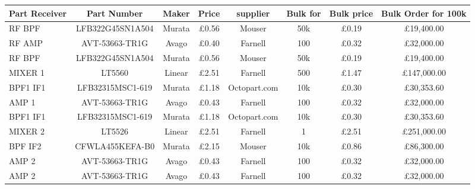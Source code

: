 

\begin{sidewaystable} %
\centering %
\begin{tabular}{l c c c c c c c} %

Part Receiver & Part Number & Maker & Price & supplier & Bulk for & Bulk price & Bulk Order for 100k\\ %
\midrule %

RF BPF& LFB322G45SN1A504& Murata& \pounds0.56 &Mouser &50k& \pounds0.19 &\pounds19,400.00\\
RF AMP & AVT-53663-TR1G &Avago &\pounds0.40 &Farnell &100 & \pounds 0.32& \pounds32,000.00\\
RF BPF& LFB322G45SN1A504& Murata& \pounds0.56 &Mouser &50k& \pounds0.19 &\pounds19,400.00\\
MIXER 1 & LT5560 &Linear 
&\pounds2.51 &Farnell &500 &\pounds1.47 &\pounds147,000.00\\
BPF1 IF1&  LFB32315MSC1-619& Murata& \pounds1.18& Octopart.com &10k& \pounds0.30& \pounds30,353.60\\
AMP 1 & AVT-53663-TR1G& Avago &\pounds0.43 &Farnell &100 &\pounds0.32 &\pounds32,000.00\\
BPF1 IF1& LFB32315MSC1-619& Murata& \pounds1.18 & Octopart.com &10k& \pounds0.30& \pounds30,353.60\\
MIXER 2& LT5526& Linear &\pounds2.51 &Farnell& 1 &\pounds2.51 &\pounds251,000.00\\
BPF IF2& CFWLA455KEFA-B0 &Murata &\pounds2.15 &Mouser &10k& \pounds0.86 &\pounds86,300.00\\
AMP 2& AVT-53663-TR1G &Avago& \pounds0.43& Farnell& 100 &\pounds0.32 &\pounds32,000.00\\

AMP 2& AVT-53663-TR1G& Avago &\pounds0.43& Farnell &100 &\pounds0.32 &\pounds32,000.00\\


\end{tabular}
\end{sidewaystable}
